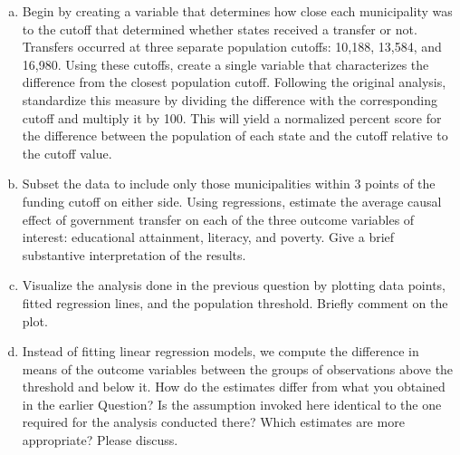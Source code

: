 \documentclass[11pt]{article}
\begin{document}
\begin{enumerate}[a.]
	\item Begin by creating a variable that determines how close each
  municipality was to the cutoff that determined whether states
  received a transfer or not. Transfers occurred at three separate
  population cutoffs: 10,188, 13,584, and 16,980. Using these cutoffs,
  create a single variable that characterizes the difference from the
  closest population cutoff.  Following the original analysis,
  standardize this measure by dividing the difference with the
  corresponding cutoff and multiply it by 100.  This will yield a
  normalized percent score for the difference between the population
  of each state and the cutoff relative to the cutoff value.
  	\item Subset the data to include
  only those municipalities within 3 points of the funding cutoff on
  either side.  Using regressions, estimate the average causal effect
  of government transfer on each of the three outcome variables of
  interest: educational attainment, literacy, and poverty.  Give a
  brief substantive interpretation of the results.
  \item Visualize the analysis done in the previous question by plotting
  data points, fitted regression lines, and the population threshold.
  Briefly comment on the plot.
  \item Instead of fitting linear regression models, we compute the
  difference in means of the outcome variables between the groups of
  observations above the threshold and below it.  How do the estimates
  differ from what you obtained in the earlier Question?  Is
  the assumption invoked here identical to the one required for the
  analysis conducted there?  Which
  estimates are more appropriate?  Please discuss.
\end{enumerate}
\end{document}
